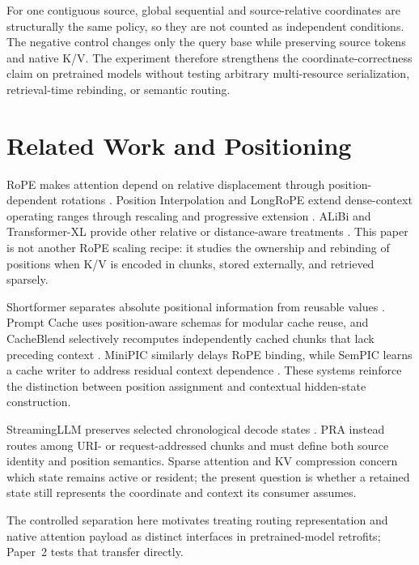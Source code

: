 \documentclass[11pt]{article}
\begin{document}
For one contiguous source, global sequential and source-relative coordinates
are structurally the same policy, so they are not counted as independent
conditions. The negative control changes only the query base while preserving
source tokens and native K/V. The experiment therefore strengthens the
coordinate-correctness claim on pretrained models without testing arbitrary
multi-resource serialization, retrieval-time rebinding, or semantic routing.

\section{Related Work and Positioning}

RoPE makes attention depend on relative displacement through position-dependent rotations
\cite{su2021roformer}. Position Interpolation and LongRoPE extend dense-context operating
ranges through rescaling and progressive extension
\cite{chen2023positioninterpolation,ding2024longrope}. ALiBi and Transformer-XL provide other
relative or distance-aware treatments \cite{press2022alibi,dai2019transformerxl}. This paper
is not another RoPE scaling recipe: it studies the ownership and rebinding of positions when
K/V is encoded in chunks, stored externally, and retrieved sparsely.

Shortformer separates absolute positional information from reusable values
\cite{press2021shortformer}. Prompt Cache uses position-aware schemas for modular cache reuse,
and CacheBlend selectively recomputes independently cached chunks that lack preceding context
\cite{gim2023promptcache,yao2024cacheblend}. MiniPIC similarly delays RoPE binding, while
SemPIC learns a cache writer to address residual context dependence
\cite{ordonez2026minipic,xie2026sempic}. These systems reinforce the distinction between
position assignment and contextual hidden-state construction.

StreamingLLM preserves selected chronological decode states \cite{xiao2023streamingllm}.
PRA instead routes among URI- or request-addressed chunks and must define both source identity
and position semantics. Sparse attention and KV compression concern which state remains
active or resident; the present question is whether a retained state still represents the
coordinate and context its consumer assumes.

The controlled separation here motivates treating routing representation and native attention
payload as distinct interfaces in pretrained-model retrofits; Paper~2 tests that transfer
directly.
\end{document}
